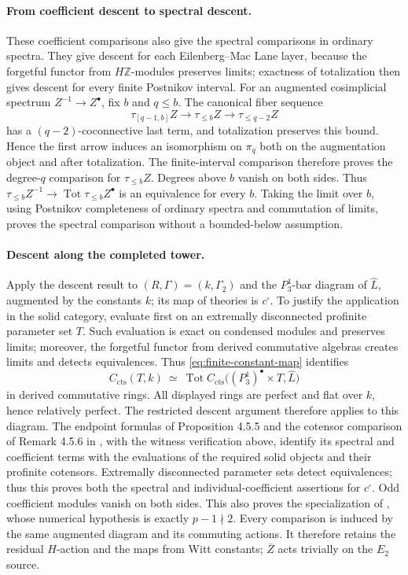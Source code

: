 \documentclass[11pt]{article}
\numberwithin{equation}{section}
\theoremstyle{definition}
\theoremstyle{remark}
\newcommand{\Z}{\mathbb Z}
\newcommand{\cts}{\mathrm{cts}}
\begin{document}
\paragraph{From coefficient descent to spectral descent.}
These coefficient comparisons also give the spectral comparisons in
ordinary spectra. They give descent for each Eilenberg--Mac Lane
layer, because the forgetful functor from $H\Z$-modules preserves limits;
exactness of totalization then gives descent for every finite Postnikov
interval. For an augmented cosimplicial spectrum
$Z^{-1}\to Z^\bullet$, fix $b$ and $q\leq b$. The canonical fiber sequence
\[
 \tau_{[q-1,b]}Z\longrightarrow\tau_{\leq b}Z
       \longrightarrow\tau_{\leq q-2}Z
\]
has a $(q-2)$-coconnective last term, and totalization preserves this
bound. Hence the first arrow induces an isomorphism on $\pi_q$ both on
the augmentation object and after totalization. The finite-interval
comparison therefore proves the degree-$q$ comparison for
$\tau_{\leq b}Z$. Degrees above $b$ vanish on both sides.
Thus $\tau_{\leq b}Z^{-1}\to\operatorname{Tot}\tau_{\leq b}Z^\bullet$
is an equivalence for every $b$. Taking the limit over $b$, using
Postnikov completeness of ordinary spectra and commutation of limits,
proves the spectral comparison without a bounded-below assumption.

\paragraph{Descent along the completed tower.}
Apply the descent result to \((R,\Gamma)=(k,\Gamma_2)\) and the
\(P_3^1\)-bar diagram of \(\widehat L\), augmented by the constants
\(k\); its map of theories is \(c^\square\). To justify the application
in the solid category, evaluate first on an extremally
disconnected profinite parameter set $T$.  Such evaluation is exact on
condensed modules and preserves limits; moreover, the forgetful functor
from derived commutative algebras creates limits and detects equivalences.
Thus \eqref{eq:finite-constant-map} identifies
\[
 C_{\cts}(T,k)\ \simeq\
 \operatorname{Tot}
 C_{\cts}\bigl((P_3^1)^{\bullet}\times T,\widehat L\bigr)
\]
in derived commutative rings.  All displayed rings are perfect and
flat over $k$, hence relatively perfect. The restricted descent argument
therefore applies to this diagram. The endpoint formulas of
Proposition 4.5.5 and the cotensor comparison of Remark 4.5.6 in
\cite{BMR2026}, with the witness verification above, identify its
spectral and coefficient terms with the evaluations of the required
solid objects and their profinite cotensors. Extremally
disconnected parameter sets detect equivalences; thus this proves both
the spectral and individual-coefficient assertions for \(c^\square\).
Odd coefficient modules vanish on both sides.  This also proves the
specialization of \cite[Theorem 5.2.6]{BMR2026}, whose numerical
hypothesis is exactly $p-1\nmid2$.
Every comparison is induced by the same augmented diagram and its
commuting actions. It therefore retains the residual \(H\)-action and
the maps from Witt constants; \(\overline Z\) acts trivially on the
\(E_2\) source.
\end{document}
